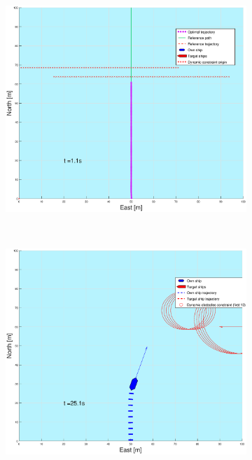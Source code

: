 \begin{figure}[!b]
    \hfill
    \begin{subfigure}[b]{0.499\textwidth}
        \centering
        \includegraphics[width=\textwidth]{Images/Figures/enkel_GW/_Simple_0fig999_time=1}
    \end{subfigure}
    \hfill
    \\
    \begin{subfigure}[b]{0.49\textwidth}
        \centering
        \includegraphics[width=\textwidth]{Images/Figures/enkel_GW/_Simple_0fig1_time=25}

\end{subfigure}
\end{figure}
